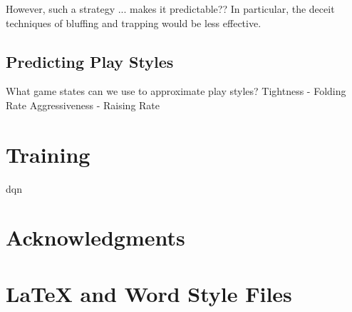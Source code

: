 \documentclass{article}
\begin{document}
However, such a strategy ... makes it predictable?? In particular, the deceit techniques of bluffing and trapping would be less effective. 

\subsection{Predicting Play Styles}

What game states can we use to approximate play styles?
Tightness - Folding Rate
Aggressiveness - Raising Rate

\section{Training}

dqn


\section*{Acknowledgments}

\appendix

\section{\LaTeX{} and Word Style Files}\label{stylefiles}



\end{document}
